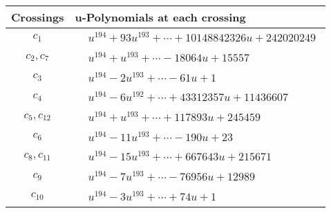 \documentclass[1p]{elsarticle_modified}
\theoremstyle{definition}
\begin{document}
\begin{tabular}{m{50pt}|m{274pt}}
Crossings & \hspace{64pt}u-Polynomials at each crossing \\
\hline $$\begin{aligned}c_{1}\end{aligned}$$&$\begin{aligned}
&u^{194}+93 u^{193}+\cdots+10148842326 u+242020249
\end{aligned}$\\
\hline $$\begin{aligned}c_{2},c_{7}\end{aligned}$$&$\begin{aligned}
&u^{194}+u^{193}+\cdots-18064 u+15557
\end{aligned}$\\
\hline $$\begin{aligned}c_{3}\end{aligned}$$&$\begin{aligned}
&u^{194}-2 u^{193}+\cdots-61 u+1
\end{aligned}$\\
\hline $$\begin{aligned}c_{4}\end{aligned}$$&$\begin{aligned}
&u^{194}-6 u^{192}+\cdots+43312357 u+11436607
\end{aligned}$\\
\hline $$\begin{aligned}c_{5},c_{12}\end{aligned}$$&$\begin{aligned}
&u^{194}+u^{193}+\cdots+117893 u+245459
\end{aligned}$\\
\hline $$\begin{aligned}c_{6}\end{aligned}$$&$\begin{aligned}
&u^{194}-11 u^{193}+\cdots-190 u+23
\end{aligned}$\\
\hline $$\begin{aligned}c_{8},c_{11}\end{aligned}$$&$\begin{aligned}
&u^{194}-15 u^{193}+\cdots+667643 u+215671
\end{aligned}$\\
\hline $$\begin{aligned}c_{9}\end{aligned}$$&$\begin{aligned}
&u^{194}-7 u^{193}+\cdots-76956 u+12989
\end{aligned}$\\
\hline $$\begin{aligned}c_{10}\end{aligned}$$&$\begin{aligned}
&u^{194}-3 u^{193}+\cdots+74 u+1
\end{aligned}$\\
\hline
\end{tabular}\\~\\
\end{document}

